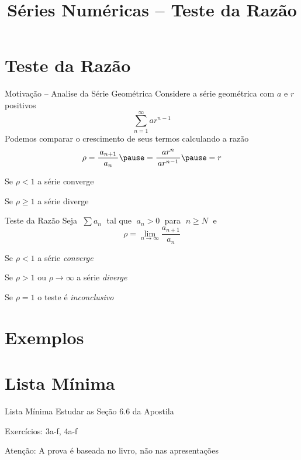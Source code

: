 \documentclass[fleqn,utf8,aspectratio=169,12pt]{beamer}
\title{Séries Numéricas -- Teste da Razão}
\begin{document}
\addtitle

\section{Teste da Razão}

\begin{proofframe}{Motivação -- Analise da Série Geométrica}
	Considere a série geométrica com $a$ e $r$ positivos
	\[
    \sum_{n=1}^{\infty} ar^{n-1}
  \]
	\pause
	Podemos comparar o crescimento de seus termos calculando a razão
	\[
    \rho
    = \frac{\,a_{n+1}\,}{a_n}
    \pause
    = \frac{ar^n}{\,ar^{n-1}\,}
    \pause
    = r
  \]

	\pause
  Se $\rho<1$     \tabto{17mm} a série converge

  \pause
  Se $\rho\geq 1$ \tabto{17mm} a série diverge
\end{proofframe}

\begin{frame}{Teste da Razão}
	Seja $\;\sum a_n\;$ tal que $\;a_n>0\;$ para $\;n\geq N\;$ \pause e
	\[
     \rho = \lim_{n\to\infty}\frac{a_{n+1}}{a_n}
  \]

  \pause
  \smallskip
	Se $\rho<1$                    \tabto{37mm} a série \emph{converge}

  \pause
  \smallskip
	Se $\rho>1$ ou $\rho\to\infty$ \tabto{37mm} a série \emph{diverge}

  \pause
  \smallskip
	Se $\rho=1$                    \tabto{37mm} o teste é \emph{inconclusivo}
\end{frame}

\section{Exemplos}






\section{Lista Mínima}

\begin{frame}{Lista Mínima}
  Estudar as Seção 6.6 da Apostila

  \vspace{\baselineskip}
  Exercícios: 3a-f, 4a-f

  \vfill
  Atenção: A prova é baseada no livro, não nas apresentações
\end{frame}

\end{document}
